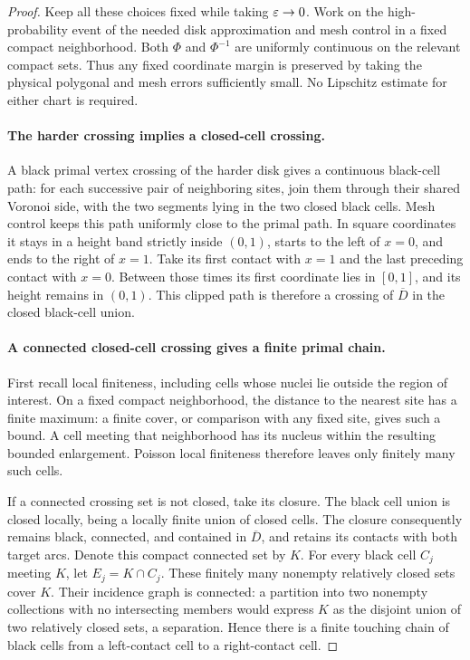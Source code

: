\begin{proof}
Keep all these choices fixed while taking $\varepsilon\to0$. Work on the
high-probability event of the needed disk approximation and mesh control
in a fixed compact neighborhood. Both $\Phi$ and $\Phi^{-1}$ are uniformly
continuous on the relevant compact sets. Thus any fixed coordinate
margin is preserved by taking the physical polygonal and mesh errors
sufficiently small. No Lipschitz estimate for either chart is required.

\paragraph{The harder crossing implies a closed-cell crossing.}
A black primal vertex crossing of the harder disk gives a continuous
black-cell path: for each successive pair of neighboring sites, join
them through their shared Voronoi side, with the two segments lying in
the two closed black cells. Mesh control keeps this path uniformly close
to the primal path. In square coordinates it stays in a height band
strictly inside $(0,1)$, starts to the left of $x=0$, and ends to the
right of $x=1$. Take its first contact with $x=1$ and the last preceding
contact with $x=0$. Between those times its first coordinate lies in
$[0,1]$, and its height remains in $(0,1)$. This clipped path is therefore
a crossing of $\overline D$ in the closed black-cell union.

\paragraph{A connected closed-cell crossing gives a finite primal chain.}
First recall local finiteness, including cells whose nuclei lie outside
the region of interest. On a fixed compact neighborhood, the distance
to the nearest site has a finite maximum: a finite cover, or comparison
with any fixed site, gives such a bound. A cell meeting that neighborhood
has its nucleus within the resulting bounded enlargement. Poisson local
finiteness therefore leaves only finitely many such cells.

If a connected crossing set is not closed, take its closure. The black
cell union is closed locally, being a locally finite union of closed
cells. The closure consequently remains black, connected, and contained
in $\overline D$, and retains its contacts with both target arcs. Denote
this compact connected set by $K$. For every black cell $C_j$ meeting
$K$, let $E_j=K\cap C_j$. These finitely many nonempty relatively closed
sets cover $K$. Their incidence graph is connected: a partition into two
nonempty collections with no intersecting members would express $K$ as
the disjoint union of two relatively closed sets, a separation. Hence
there is a finite touching chain of black cells from a left-contact cell
to a right-contact cell.


\end{proof}
